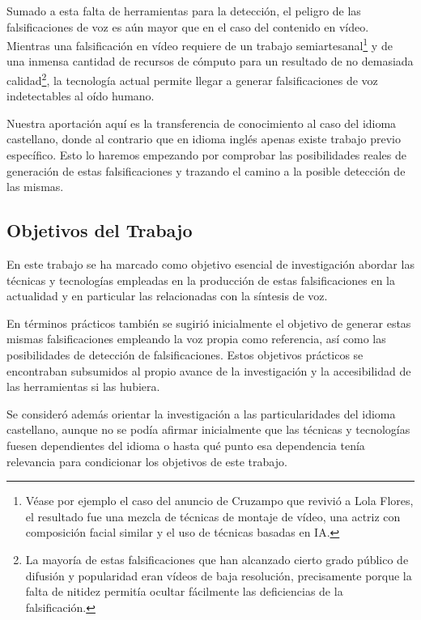 Sumado a esta falta de herramientas para la detección, el peligro de las falsificaciones de voz es aún mayor que en el caso del contenido en vídeo. Mientras una falsificación en vídeo requiere de un trabajo semiartesanal\footnote{Véase por ejemplo el caso del anuncio de Cruzampo que revivió a Lola Flores, el resultado fue una mezcla de técnicas de montaje de vídeo, una actriz con composición facial similar y el uso de técnicas basadas en IA. } y de una inmensa cantidad de recursos de cómputo para un resultado de no demasiada calidad\footnote{La mayoría de estas falsificaciones que han alcanzado cierto grado público de difusión y popularidad eran vídeos de baja resolución, precisamente porque la falta de nitidez permitía ocultar fácilmente las deficiencias de la falsificación.}, la tecnología actual permite llegar a generar falsificaciones de voz indetectables al oído humano.

Nuestra aportación aquí es la transferencia de conocimiento al caso del idioma castellano, donde al contrario que en idioma inglés apenas existe trabajo previo específico. Esto lo haremos empezando por comprobar las posibilidades reales de generación de estas falsificaciones y trazando el camino a la posible detección de las mismas.

\subsection{Objetivos del Trabajo}


En este trabajo se ha marcado como objetivo esencial de investigación abordar las técnicas y tecnologías empleadas en la producción de estas falsificaciones en la actualidad y en particular las relacionadas con la síntesis de voz.

En términos prácticos también se sugirió inicialmente el objetivo de generar estas mismas falsificaciones empleando la voz propia como referencia, así como las posibilidades de detección de falsificaciones. Estos objetivos prácticos se encontraban subsumidos al propio avance de la investigación y la accesibilidad de las herramientas si las hubiera.

Se consideró además orientar la investigación a las particularidades del idioma castellano, aunque no se podía afirmar inicialmente que las técnicas y tecnologías fuesen dependientes del idioma o hasta qué punto esa dependencia tenía relevancia para condicionar los objetivos de este trabajo.

